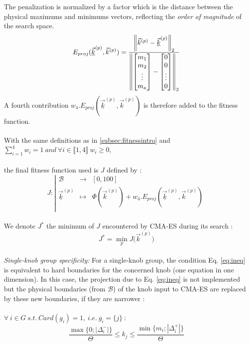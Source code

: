 The penalization is normalized by a factor which is the distance between the physical maximums and minimums vectors, reflecting the \emph{order of magnitude} of the search space.
\begin{equation*}
	E_{proj}(\underline{\vec{k}}^{(p)},\vec{k}^{(p)})=\frac{\left\lVert\vec{k}^{(p)}-\underline{\vec{k}}^{(p)}\right\rVert_{2}}{\left\lVert\begin{bmatrix}m_{1}\\m_{2}\\\vdots\\m_{\kappa}\end{bmatrix}-\begin{bmatrix}0\\0\\\vdots\\0\end{bmatrix}\right\rVert_{2}}
\end{equation*}
A fourth contribution $w_{4}.E_{proj}(\underline{\vec{k}}^{(p)},\vec{k}^{(p)})$ is therefore added to the fitness function.\\
\\
With the same definitions as in \ref{subsec:fitnessintro} and\\
$\sum_{i=1}^{4} w_{i}=1\ and\ \forall i\in\llbracket 1,4\rrbracket\ w_{i}\geq 0$,\\
\\
the final fitness function used is $J$ defined by :\\
\begin{equation*}
		J:
		\left|
  		\begin{array}{rcl}
    	\mathscr{B} & \longrightarrow &[0,100] \\
    	\underline{\vec{k}}^{(p)} & \longmapsto &  \Phi(\vec{k}^{(p)})+w_{4}.E_{proj}(\underline{\vec{k}}^{(p)},\vec{k}^{(p)}) \\
  	\end{array}
	\right.
\end{equation*}
\\
We denote $J^{*}$ the minimum of $J$ encountered by CMA-ES during its search :
\begin{equation*}
	J^{*}=\min_{p}{J({\vec{k}^{(p)})}}
\end{equation*}
\\
\emph{Single-knob group specificity:} For a single-knob group, the condition Eq. \ref{eq:ineq} is equivalent to hard boundaries for the concerned knob (one equation in one dimension). In this case, the projection due to Eq. \ref{eq:ineq} is not implemented but the physical boundaries (from $\mathscr{B}$) of the knob input to CMA-ES are replaced by these new boundaries, if they are narrower :\\
\\
$\forall\ i\in G\ s.t.\ Card(g_{i})=1,\ i.e.\ g_{i}=\{j\}\ :$
\begin{equation}
	\frac{\max{\big\{0;|\Delta_{i}^{-}|\big\}}}{\Theta}\leq k_{j} \leq \frac{\min{\big\{m_{i};|\Delta_{i}^{+}|\big\}}}{\Theta}
\end{equation}
